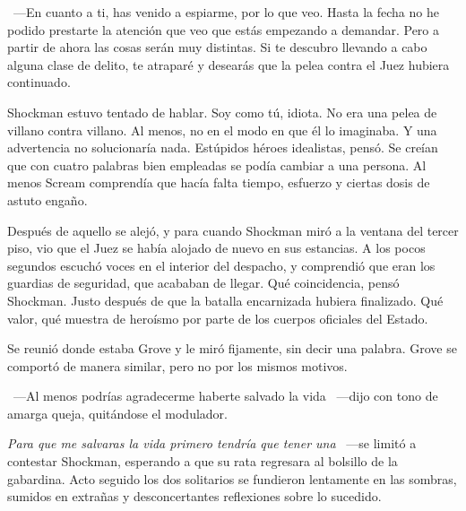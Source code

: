 ~---En cuanto a ti, has venido a espiarme, por lo que veo. Hasta la fecha no he podido prestarte la atención que veo que estás empezando a demandar. Pero a partir de ahora las cosas serán muy distintas. Si te descubro llevando a cabo alguna clase de delito, te atraparé y desearás que la pelea contra el Juez hubiera continuado.

Shockman estuvo tentado de hablar. Soy como tú, idiota. No era una pelea de villano contra villano. Al menos, no en el modo en que él lo imaginaba. Y una advertencia no solucionaría nada. Estúpidos héroes idealistas, pensó. Se creían que con cuatro palabras bien empleadas se podía cambiar a una persona. Al menos Scream comprendía que hacía falta tiempo, esfuerzo y ciertas dosis de astuto engaño.

Después de aquello se alejó, y para cuando Shockman miró a la ventana del tercer piso, vio que el Juez se había alojado de nuevo en sus estancias. A los pocos segundos escuchó voces en el interior del despacho, y comprendió que eran los guardias de seguridad, que acababan de llegar. Qué coincidencia, pensó Shockman. Justo después de que la batalla encarnizada hubiera finalizado. Qué valor, qué muestra de heroísmo por parte de los cuerpos oficiales del Estado.

Se reunió donde estaba Grove y le miró fijamente, sin decir una palabra. Grove se comportó de manera similar, pero no por los mismos motivos.

~---Al menos podrías agradecerme haberte salvado la vida ~---dijo con tono de amarga queja, quitándose el modulador.

\emph{Para que me salvaras la vida primero tendría que tener una} ~---se limitó a contestar Shockman, esperando a que su rata regresara al bolsillo de la gabardina. Acto seguido los dos solitarios se fundieron lentamente en las sombras, sumidos en extrañas y desconcertantes reflexiones sobre lo sucedido.

\endinput
